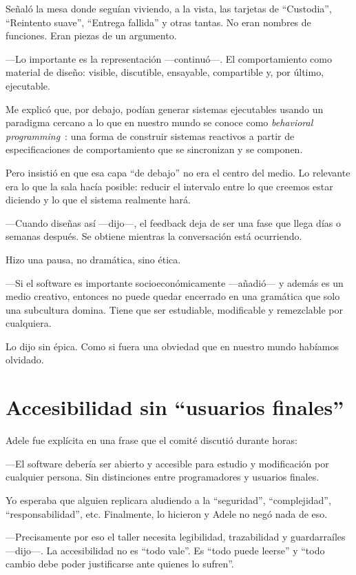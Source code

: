 \documentclass[11pt,a4paper]{article}
\begin{document}
Señaló la mesa donde seguían viviendo, a la vista, las tarjetas de
``Custodia'', ``Reintento suave'', ``Entrega fallida'' y otras tantas. No eran
nombres de funciones. Eran piezas de un argumento.

---Lo importante es la representación ---continuó---. El comportamiento como
material de diseño: visible, discutible, ensayable, compartible y, por último,
ejecutable.

Me explicó que, por debajo, podían generar sistemas ejecutables usando un
paradigma cercano a lo que en nuestro mundo se conoce como \emph{behavioral
programming}~\cite{harel}: una forma de construir sistemas reactivos a partir
de especificaciones de comportamiento que se sincronizan y se componen.

Pero insistió en que esa capa ``de debajo'' no era el centro del medio. Lo
relevante era lo que la sala hacía posible: reducir el intervalo entre lo que
creemos estar diciendo y lo que el sistema realmente hará.

---Cuando diseñas así ---dijo---, el feedback deja de ser una fase que llega
días o semanas después. Se obtiene mientras la conversación está ocurriendo.

Hizo una pausa, no dramática, sino ética.

---Si el software es importante socioeconómicamente ---añadió--- y además es
un medio creativo, entonces no puede quedar encerrado en una gramática que
solo una subcultura domina. Tiene que ser estudiable, modificable y
remezclable por cualquiera.

Lo dijo sin épica. Como si fuera una obviedad que en nuestro mundo habíamos
olvidado.

\section{Accesibilidad sin ``usuarios finales''}

Adele fue explícita en una frase que el comité discutió durante horas:

---El software debería ser abierto y accesible para estudio y modificación por
cualquier persona. Sin distinciones entre programadores y usuarios finales.

Yo esperaba que alguien replicara aludiendo a la ``seguridad'',
``complejidad'', ``responsabilidad'', etc. Finalmente, lo hicieron y Adele no
negó nada de eso.

---Precisamente por eso el taller necesita legibilidad, trazabilidad y
guardarraíles ---dijo---. La accesibilidad no es ``todo vale''. Es ``todo
puede leerse'' y ``todo cambio debe poder justificarse ante quienes lo
sufren''.
\end{document}
